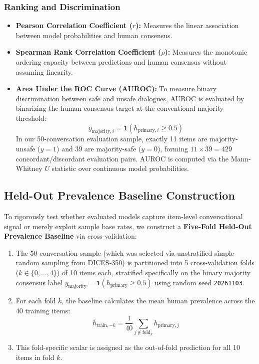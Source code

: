 \subsubsection{Ranking and Discrimination}
\begin{itemize}
    \item \textbf{Pearson Correlation Coefficient ($r$):} Measures the linear association between model probabilities and human consensus.
    \item \textbf{Spearman Rank Correlation Coefficient ($\rho$):} Measures the monotonic ordering capacity between predictions and human consensus without assuming linearity.
    \item \textbf{Area Under the ROC Curve (AUROC):} To measure binary discrimination between safe and unsafe dialogues, AUROC is evaluated by binarizing the human consensus target at the conventional majority threshold:
    \begin{equation}
        y_{\text{majority}, i} = \mathbf{1}(h_{\text{primary}, i} \ge 0.5)
        \label{eq:majority_label}
    \end{equation}
    In our 50-conversation evaluation sample, exactly 11 items are majority-unsafe ($y = 1$) and 39 are majority-safe ($y = 0$), forming $11 \times 39 = 429$ concordant/discordant evaluation pairs. AUROC is computed via the Mann-Whitney $U$ statistic over continuous model probabilities.
\end{itemize}

\subsection{Held-Out Prevalence Baseline Construction}
\label{sec:baseline_construction}

To rigorously test whether evaluated models capture item-level conversational signal or merely exploit sample base rates, we construct a \textbf{Five-Fold Held-Out Prevalence Baseline} via cross-validation:
\begin{enumerate}
    \item The 50-conversation sample (which was selected via unstratified simple random sampling from DICES-350) is partitioned into 5 cross-validation folds ($k \in \{0, \dots, 4\}$) of 10 items each, stratified specifically on the binary majority consensus label $y_{\text{majority}} = \mathbf{1}(h_{\text{primary}} \ge 0.5)$ using random seed \texttt{20261103}.
    \item For each fold $k$, the baseline calculates the mean human prevalence across the 40 training items:
    \begin{equation}
        \bar{h}_{\text{train}, -k} = \frac{1}{40}\sum_{j \notin \text{fold}_k} h_{\text{primary}, j}
    \end{equation}
    \item This fold-specific scalar is assigned as the out-of-fold prediction for all 10 items in fold $k$.
\end{enumerate}

